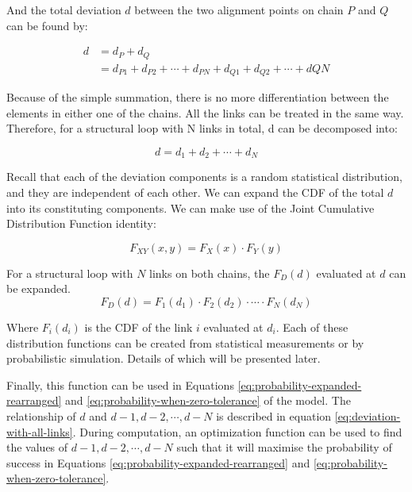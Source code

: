 And the total deviation $d$ between the two alignment points on chain $P$ and $Q$ can be found by:

\begin{align} \label{eq:deviation-with-two-links}
    d &= d_P + d_Q \nonumber\\
      &= d_{P1} + d_{P2} + \cdots + d_{PN} + d_{Q1} + d_{Q2} + \cdots + dQN 
\end{align}

Because of the simple summation, there is no more differentiation between the elements in either one of the chains. All the links can be treated in the same way. Therefore, for a structural loop with N links in total, d can be decomposed into:

\begin{equation} \label{eq:deviation-with-all-links}
    d = d_1 + d_2 + \cdots + d_N
\end{equation}

Recall that each of the deviation components is a random statistical distribution, and they are independent of each other. We can expand the CDF of the total $d$ into its constituting components. We can make use of the Joint Cumulative Distribution Function identity:

\begin{equation}
    F_{XY}(x,y) = F_X(x) \cdot F_Y(y)
\end{equation}

For a structural loop with $N$ links on both chains, the $F_D(d)$ evaluated at $d$ can be expanded. 
\begin{equation}  \label{eq:probability-with-all-links}
    F_D(d) = F_1(d_1) \cdot F_2(d_2) \cdot \cdots \cdot F_N(d_N)
\end{equation}

Where $F_i(d_i)$ is the CDF of the link $i$ evaluated at $d_i$. Each of these distribution functions can be created from statistical measurements or by probabilistic simulation. Details of which will be presented later.

Finally, this function can be used in Equations \ref{eq:probability-expanded-rearranged} and \ref{eq:probability-when-zero-tolerance} of the model. The relationship of $d$ and $d-1, d-2, \cdots , d-N$ is described in equation \ref{eq:deviation-with-all-links}. During computation, an optimization function can be used to find the values of $d-1, d-2, \cdots , d-N$ such that it will maximise the probability of success in Equations \ref{eq:probability-expanded-rearranged} and \ref{eq:probability-when-zero-tolerance}.

